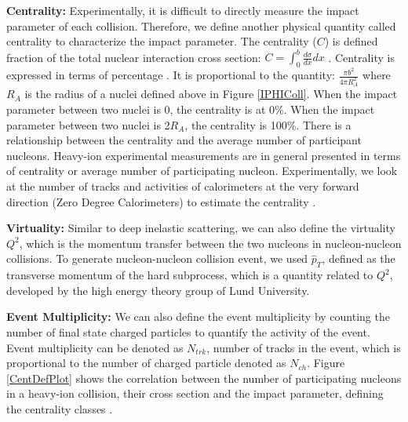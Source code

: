 \textbf{Centrality:} Experimentally, it is difficult to directly measure the impact parameter of each collision. Therefore, we define another physical quantity called centrality to characterize the impact parameter. The centrality ($C$) is defined fraction of the total nuclear interaction cross section: $C = \int^b_0 \frac{d\sigma}{dx} dx$ . Centrality is expressed in terms of percentage \cite{CentDef}. It is proportional to the quantity: $\frac{\pi b^2}{4\pi R_A^2}$ where $R_A$ is the radius of a nuclei defined above in Figure \ref{IPHIColl}. When the impact parameter between two nuclei is 0, the centrality is at 0\%. When the  impact parameter between two nuclei is 2$R_A$, the centrality is 100\%. There is a relationship between the centrality and the average number of participant nucleons. Heavy-ion experimental measurements are in general presented in terms of centrality or average number of participating nucleon. Experimentally, we look at the number of tracks and activities of calorimeters at the very forward direction (Zero Degree Calorimeters) to estimate the centrality \cite{ALICEZDC,CMSZDC,ATLASZDC}. 


\textbf{Virtuality:} Similar to deep inelastic scattering, we can also define the virtuality $Q^2$, which is the momentum transfer between the two nucleons in nucleon-nucleon collisions. To generate nucleon-nucleon collision event, we used $\hat p_T$, defined as the transverse momentum of the hard subprocess, which is a quantity related to $Q^2$, developed by the high energy theory group of Lund University.



\textbf{Event Multiplicity:} We can also define the event multiplicity by counting the number of final state charged particles to quantify the activity of the event. Event multiplicity can be denoted as $N_{trk}$, number of tracks in the event, which is proportional to the number of charged particle denoted as $N_{ch}$. Figure \ref{CentDefPlot} shows the correlation between the number of participating nucleons in a heavy-ion collision, their cross section and the impact parameter, defining the centrality classes \cite{CentPlot}.


